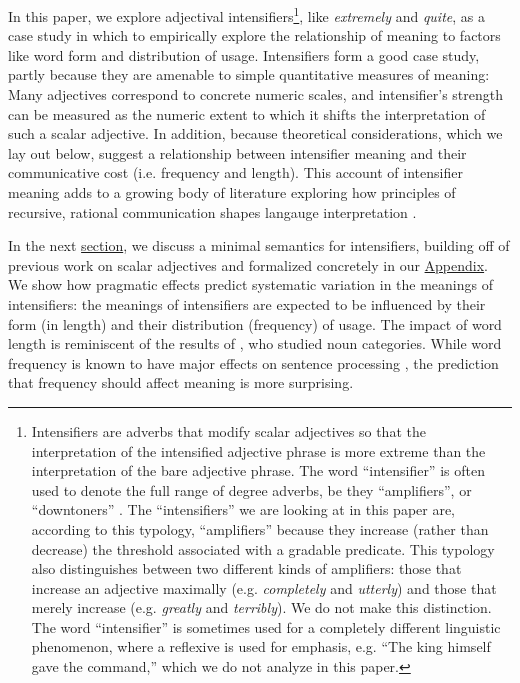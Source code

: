 \documentclass[10pt,letterpaper]{article}
\newcommand{\w}[1]{\emph{#1}}
\begin{document}
In this paper, we explore adjectival intensifiers\footnote{
Intensifiers are adverbs that modify scalar adjectives so that the interpretation of the intensified adjective phrase is more extreme than the interpretation of the bare adjective phrase.
The word ``intensifier'' is often used to denote the full range of degree adverbs, be they ``amplifiers'', or ``downtoners'' \cite{quirk}.
The ``intensifiers'' we are looking at in this paper are, according to this typology, ``amplifiers'' because they increase (rather than decrease) the threshold associated with a gradable predicate.
This typology also distinguishes between two different kinds of amplifiers: those that increase an adjective maximally (e.g. \w{completely} and \w{utterly}) and those that merely increase (e.g. \w{greatly} and \w{terribly}).
We do not make this distinction.
The word ``intensifier'' is sometimes used for a completely different linguistic phenomenon, where a reflexive is used for emphasis, e.g. ``The king himself gave the command,'' which we do not analyze in this paper. 
},
like \w{extremely} and \w{quite}, as a case study in which to empirically explore the relationship of meaning to factors like word form and distribution of usage.
Intensifiers form a good case study, partly because they are amenable to simple quantitative measures of meaning: Many adjectives correspond to concrete numeric scales, and intensifier's strength can be measured as the numeric extent to which it shifts the interpretation of such a scalar adjective. In addition, because theoretical considerations, which we lay out below, suggest a relationship between intensifier meaning and their communicative cost (i.e. frequency and length).
This account of intensifier meaning adds to a growing body of literature exploring how principles of recursive, rational communication shapes langauge interpretation \cite[e.g.]{grice_logic_1975, frank_predicting_2012, goodman_knowledge_2013, franke_quantity_2011, russell_probabilistic_2012, kao_nonliteral_2014, bergen_pragmatic_2014}.

In the next \hyperref[sec:semantics]{section}, we discuss a minimal semantics for intensifiers, building off of previous work on scalar adjectives and formalized concretely in our \hyperref[app:model]{Appendix}.
We show how pragmatic effects predict systematic variation in the meanings of intensifiers: the meanings of intensifiers are expected to be influenced by their form (in length) and their distribution (frequency) of usage.
The impact of word length is reminiscent of the results of \cite{lewis}, who studied noun categories.
While word frequency is known to have major effects on sentence processing \cite[e.g.]{levy_expectation-based_2008}, the prediction that frequency should affect meaning is more surprising.
\end{document}
